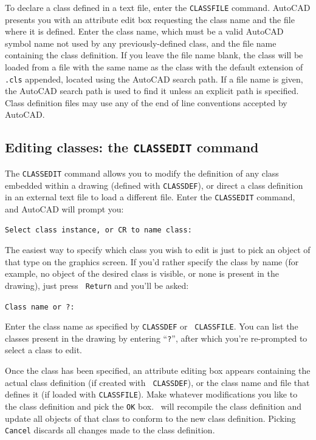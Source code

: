 \documentclass{article}
\begin{document}
To declare a class defined in a text file, enter the {\tt CLASSFILE}
command.  AutoCAD presents you with an attribute edit box requesting
the class name and the file where it is defined.  Enter the class
name, which must be a valid AutoCAD symbol name not used by any
previously-defined class, and the file name containing the class
definition.  If you leave the file name blank, the class will be
loaded from a file with the same name as the class with the default
extension of {\tt .cls} appended, located using the AutoCAD search
path.  If a file name is given, the AutoCAD search path is
used to find it unless an explicit path is specified.  Class
definition files may use any of the end of line conventions accepted
by AutoCAD\@.

\subsection{Editing classes: the {\tt CLASSEDIT} command}

The {\tt CLASSEDIT} command allows you to modify the definition of any
class embedded within a drawing (defined with {\tt CLASSDEF}), or
direct a class definition in an external text file to load a
different file.  Enter the {\tt CLASSEDIT} command, and AutoCAD will
prompt you:

{\tt Select class instance, or CR to name class:}

The easiest way to specify which class you wish to edit is just to
pick an object of that type on the graphics screen.  If you'd rather
specify the class by name (for example, no object of the desired
class is visible, or none is present in the drawing), just press {\tt
Return} and you'll be asked:

{\tt Class name or ?:}

Enter the class name as specified by {\tt CLASSDEF} or {\tt
CLASSFILE}.  You can list the classes present in the drawing by
entering ``{\tt ?}'', after which you're re-prompted to select a
class to edit.

Once the class has been specified, an attribute editing box appears
containing the actual class definition (if created with {\tt
CLASSDEF}), or the class name and file that defines it (if loaded with
{\tt CLASSFILE})\@.  Make whatever modifications you like to the class
definition and pick the {\tt OK} box.  \cw\ will recompile the class
definition and update all objects of that class to conform to the new
class definition.  Picking {\tt Cancel} discards all changes made to
the class definition.
\end{document}
